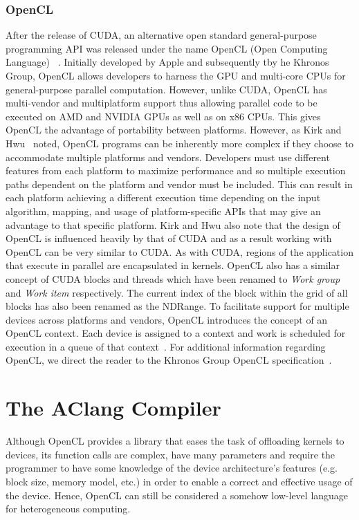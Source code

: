 \documentclass[Ingles]{ic-tese-v1}
\newcommand{\tit}[1]{{\textit{#1}}}
\begin{document}
\subsubsection{OpenCL}

After the release of CUDA, an alternative open standard general-purpose programming
API was released under the name OpenCL (Open Computing Language) ~\cite{Kirk:2012}.
Initially developed by Apple and subsequently tby he Khronos Group, OpenCL allows
developers to harness the GPU and multi-core CPUs for general-purpose parallel
computation. However, unlike CUDA, OpenCL has multi-vendor and multiplatform
support thus allowing parallel code to be executed on AMD and NVIDIA GPUs
as well as on x86 CPUs. This gives OpenCL the advantage of portability between
platforms. However, as Kirk and Hwu~\cite{Kirk:2012} noted, OpenCL programs 
can be inherently more complex if they choose to accommodate multiple platforms and vendors.
Developers must use different features from each platform to maximize performance
and so multiple execution paths dependent on the platform and vendor must be
included. This can result in each platform achieving a different execution time
depending on the input algorithm, mapping, and usage of platform-specific APIs
that may give an advantage to that specific platform. Kirk and Hwu also note
that the design of OpenCL is influenced heavily by that of CUDA and as a result
working with OpenCL can be very similar to CUDA. As with CUDA, regions of
the application that execute in parallel are encapsulated in kernels. OpenCL also
has a similar concept of CUDA blocks and threads which have been renamed to
\tit{Work group} and \tit{Work item} respectively. The current index of the block within the
grid of all blocks has also been renamed as the NDRange. To facilitate support for
multiple devices across platforms and vendors, OpenCL introduces the concept of
an OpenCL context. Each device is assigned to a context and work is scheduled
for execution in a queue of that context~\cite{Kirk:2012}. For additional information 
regarding OpenCL, we direct the reader to the Khronos Group OpenCL 
specification~\cite{opencl}.

\section{The AClang Compiler}
\label{sec:AClang}

Although OpenCL provides  a library that eases the  task of offloading
kernels  to  devices,  its  function  calls  are  complex,  have  many
parameters and  require the programmer  to have some knowledge  of the
device architecture's  features (e.g. block size,  memory model, etc.)
in order to enable a correct and effective usage of the device. Hence,
OpenCL  can  still  be  considered a  somehow  low-level  language  for
heterogeneous computing.
\end{document}

